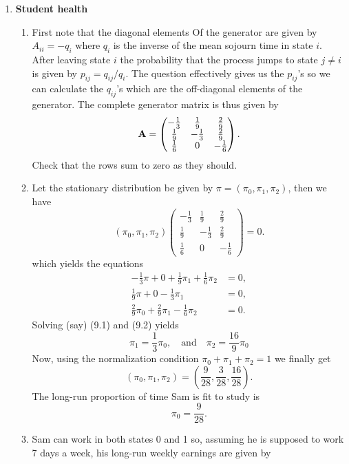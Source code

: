 \documentclass[11pt,a4paper]{article}
\begin{document}
\begin{enumerate}
    \item \textbf{Student health}
    \begin{enumerate}
      \item First note that the diagonal elements Of the generator are given by $A_{ii} = -q_i$ where $q_i$ is the inverse of the mean sojourn time in state $i$. After leaving state $i$ the probability that the process jumps to state $j \neq i$ is given by $p_{ij} = q_{ij}/q_i$. The question effectively gives us the $p_{ij}$'s so we can calculate the $q_{ij}$'s which are the off-diagonal elements of the generator. The complete generator matrix is thus given by
      $$
      \vb{A} =
      \begin{pmatrix}
        -\frac{1}{3} & \frac{1}{9} & \frac{2}{9}\\
        \frac{1}{9} & -\frac{1}{3} & \frac{2}{9}\\
        \frac{1}{6} & 0 & -\frac{1}{6}
      \end{pmatrix}.
      $$
      Check that the rows sum to zero as they should.
      \item Let the stationary distribution be given by $\pi = (\pi_0, \pi_1, \pi_2)$, then we have
      $$
      (\pi_0, \pi_1, \pi_2)
      \begin{pmatrix}
        -\frac{1}{3} & \frac{1}{9} & \frac{2}{9}\\
        \frac{1}{9} & -\frac{1}{3} & \frac{2}{9}\\
        \frac{1}{6} & 0 & -\frac{1}{6}
      \end{pmatrix}
      = 0.
      $$
      which yields the equations
      \begin{align}
        \tag{9.1}
        -\frac{1}{3}\pi+0 + \frac{1}{9}\pi_1 + \frac{1}{6}\pi_2 &= 0,\\
        \tag{9.2}
        \frac{1}{9}\pi+0 - \frac{1}{3}\pi_1 &= 0,\\
        \tag{9.3}
        \frac{2}{9}\pi_0 + \frac{2}{9}\pi_1 - \frac{1}{6}\pi_2 &= 0.
      \end{align}
      Solving (say) (9.1) and (9.2) yields
      $$
      \pi_1 = \frac{1}{3}\pi_0,\quad\text{and}\quad \pi_2 = \frac{16}{9}\pi_0
      $$
      Now, using the normalization condition $\pi_0 + \pi_1 + \pi_2 = 1$ we finally get
      $$
      (\pi_0, \pi_1, \pi_2) = (\frac{9}{28}, \frac{3}{28}, \frac{16}{28}).
      $$
      The long-run proportion of time Sam is fit to study is
      $$
      \pi_0 = \frac{9}{28}.
      $$
      \item Sam can work in both states 0 and 1 so, assuming he is supposed to work 7 days a week, his long-run weekly earnings are given by

\end{enumerate}
\end{enumerate}
\end{document}
